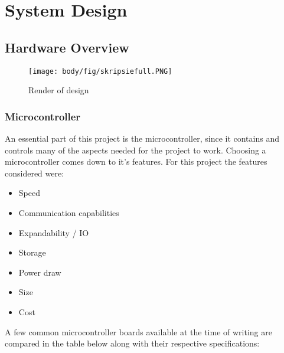 \chapter{System Design}
\vspace{-2em}
\section{Hardware Overview}
\vspace{-2em}
\begin{figure}[!htb]
	\centering
	\texttt{[image: body/fig/skripsiefull.PNG]}
	\caption{Render of design  }
	\label{fig:fulldrawio}
\end{figure}

\vspace{-2em}
\subsection{Microcontroller}
An essential part of this project is the microcontroller, since it contains and controls many of the aspects needed for the project to work.
Choosing a microcontroller comes down to it's features. For this project the features considered were:
\begin{itemize}
	\item Speed
	\item Communication capabilities
	\item Expandability / IO
	\item Storage
	\item Power draw
	\item Size
	\item Cost
\end{itemize}

\noindent
A few common microcontroller boards available at the time of writing are compared in the table below along with their respective specifications:




